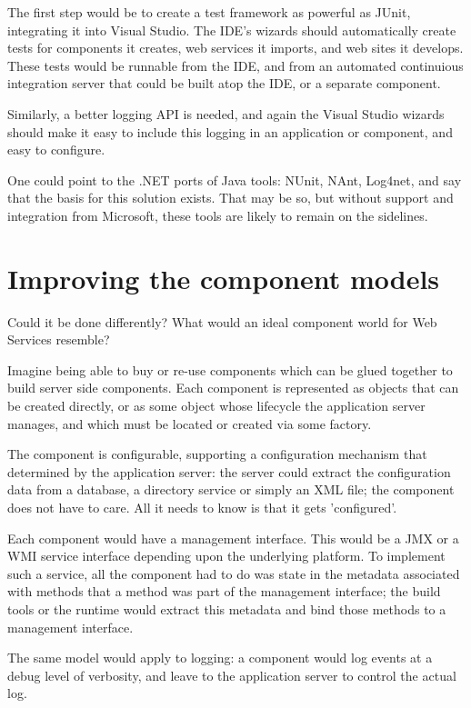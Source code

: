 \documentclass[draft]{report}
\begin{document}
The first step would be to create a test framework as powerful as JUnit,
integrating it into Visual Studio. The IDE's wizards should
automatically create tests for components it creates, web services it
imports, and web sites it develops. These tests would be runnable from
the IDE, and from an automated continuious integration server that could
be built atop the IDE, or a separate component.

Similarly, a better logging API is needed, and again the Visual Studio
wizards should make it easy to include this logging in an application or
component, and easy to configure.

One could point to the .NET ports of Java tools: NUnit, NAnt, Log4net,
and say that the basis for this solution exists. That may be so, but
without support and integration from Microsoft, these tools are likely
to remain on the sidelines.

\section{Improving the component models}

Could it be done differently? What would an ideal component world for
Web Services resemble?

Imagine being able to buy or re-use components which can be glued
together to build server side components. Each component is represented
as objects that can be created directly, or as some object whose
lifecycle the application server manages, and which must be located or
created via some factory.

The component is configurable, supporting a configuration mechanism that
determined by the application server: the server could extract the
configuration data from a database, a directory service or simply an XML
file; the component does not have to care. All it needs to know is that
it gets 'configured'.

Each component would have a management interface. This would be a JMX or
a WMI service interface depending upon the underlying platform. To
implement such a service, all the component had to do was state in the
metadata associated with methods that a method was part of the
management interface; the build tools or the runtime would extract this
metadata and bind those methods to a management interface.

The same model would apply to logging: a component would log events at a
debug level of verbosity, and leave to the application server to control
the actual log.
\end{document}
